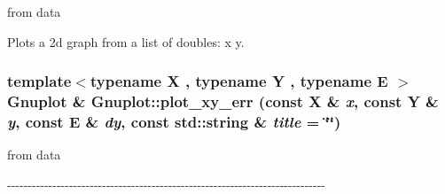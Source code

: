 from data 

Plots a 2d graph from a list of doubles: x y. \hypertarget{class_gnuplot_acf63292d401a8012a82ac69ec2726d67}{
\subsubsection[{plot\_\-xy\_\-err}]{\setlength{\rightskip}{0pt plus 5cm}template$<$typename X , typename Y , typename E $>$ {\bf Gnuplot} \& Gnuplot::plot\_\-xy\_\-err (const X \& {\em x}, \/  const Y \& {\em y}, \/  const E \& {\em dy}, \/  const std::string \& {\em title} = {\ttfamily \char`\"{}\char`\"{}})}}
\label{class_gnuplot_acf63292d401a8012a82ac69ec2726d67}


from data 

-\/-\/-\/-\/-\/-\/-\/-\/-\/-\/-\/-\/-\/-\/-\/-\/-\/-\/-\/-\/-\/-\/-\/-\/-\/-\/-\/-\/-\/-\/-\/-\/-\/-\/-\/-\/-\/-\/-\/-\/-\/-\/-\/-\/-\/-\/-\/-\/-\/-\/-\/-\/-\/-\/-\/-\/-\/-\/-\/-\/-\/-\/-\/-\/-\/-\/-\/-\/-\/-\/-\/-\/-\/-\/-\/-\/-\/

